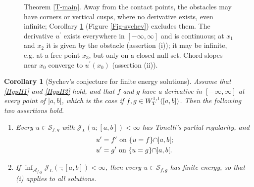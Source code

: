 \documentclass[reqno,12pt]{amsart}
\numberwithin{equation}{section}
\def\J{\mathcal{J}_L}
\def\A{\mathcal{A}_{f,g}}
\def\Sol{\mathcal{S}_{f,g}}
\newtheorem{corollary}[theorem]{Corollary}
\theoremstyle{remark}
\begin{document}
\begin{figure}[H]
\caption{Theorem \ref{T-main}. Away from the contact points, the obstacles may have corners or vertical cusps, where no derivative exists, even infinite; Corollary \ref{C-sychev} (Figure \ref{Fig-sychev}) excludes them. The derivative $u^\prime$ exists everywhere in $[-\infty,\infty]$ and is continuous; at $x_1$ and $x_2$ it is given by the obstacle (assertion (i)); it may be infinite, e.g. at a free point $x_3$, but only on a closed null set. Chord slopes near $x_0$ converge to $u^\prime(x_0)$ (assertion (ii)).}\label{Fig-main}
\end{figure}

\begin{corollary}[Sychev's conjecture for finite energy solutions]\label{C-sychev}
Assume that \ref{HypH1} and \ref{HypH2} hold, and that $f$ and $g$ have a derivative in $[-\infty,\infty]$ at every point of $]a,b[$, which is the case if $f,g\in W^{1,1}_{\rm T}([a,b])$. Then the following two assertions hold.
\begin{enumerate}[leftmargin=3em, itemsep=0.8em, topsep=0.5em]
\item[{\rm(i)}] Every $u\in\Sol$ with $\J(u;[a,b])<\infty$ has Tonelli's partial regularity, and
\begin{align*}
&u^\prime=f^\prime\hbox{ on }\{u=f\}\cap]a,b[;\\
&u^\prime=g^\prime\hbox{ on }\{u=g\}\cap]a,b[.
\end{align*}
\item[{\rm(ii)}] If $\inf_{\A}\J(\cdot;[a,b])<\infty$, then every $u\in\Sol$ has finite energy, so that {\rm(i)} applies to all solutions.
\end{enumerate}
\end{corollary}
\end{document}
